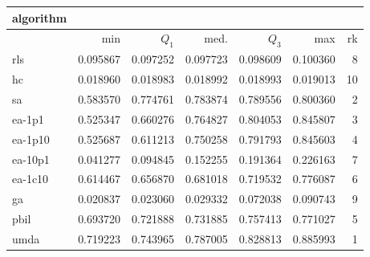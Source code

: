 \begin{tabular}{@{}l*{5}{>{{}}N{1}{3}}>{{}}N{2}{0}@{}}
\toprule
{algorithm} &  \\
\midrule
& {min} & {$Q_1$} & {med.} & {$Q_3$} & {max} & {rk}\\
\midrule
rls & 0.095867 & 0.097252 & 0.097723 & 0.098609 & 0.100360 & 8\\
hc & 0.018960 & 0.018983 & 0.018992 & 0.018993 & 0.019013 & 10\\
sa & 0.583570 & {\color{blue}} 0.774761 & 0.783874 & 0.789556 & 0.800360 & 2\\
ea-1p1 & 0.525347 & 0.660276 & 0.764827 & 0.804053 & 0.845807 & 3\\
ea-1p10 & 0.525687 & 0.611213 & 0.750258 & 0.791793 & 0.845603 & 4\\
ea-10p1 & 0.041277 & 0.094845 & 0.152255 & 0.191364 & 0.226163 & 7\\
ea-1c10 & 0.614467 & 0.656870 & 0.681018 & 0.719532 & 0.776087 & 6\\
ga & 0.020837 & 0.023060 & 0.029332 & 0.072038 & 0.090743 & 9\\
pbil & 0.693720 & 0.721888 & 0.731885 & 0.757413 & 0.771027 & 5\\
umda & {\color{blue}} 0.719223 & 0.743965 & {\color{blue}} 0.787005 & {\color{blue}} 0.828813 & {\color{blue}} 0.885993 & 1\\
\bottomrule
\end{tabular}
